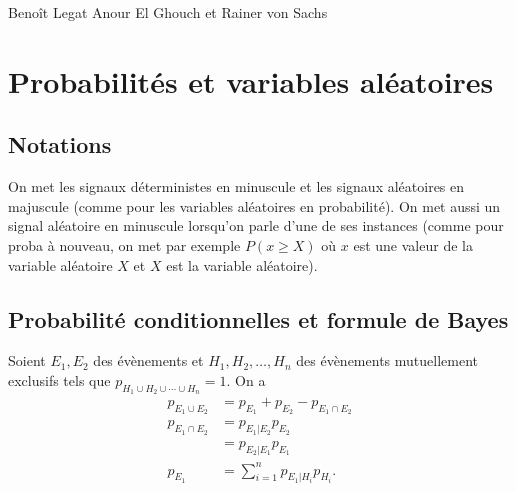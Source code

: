 

\usepackage{qtree}

\def\Perp{\perp\!\!\!\perp}

\renewcommand{\E}{\mathbb{E}}
\newcommand{\N}{\mathcal{N}}
\DeclareMathOperator{\var}{\mathbb{V}ar}
\DeclareMathOperator{\cov}{Cov}
\DeclareMathOperator{\bias}{Bias}

\DeclareMathOperator{\bin}{Bin}
\DeclareMathOperator{\expo}{Expo}
\DeclareMathOperator{\gammad}{Gamma}
\DeclareMathOperator{\po}{Po}

\newcommand{\fourier}{\mathcal{F}}
\newcommand{\esth}{\hat{\theta}}
\newcommand{\esthls}{\esth^{LS}}
\newcommand{\esthcm}{\esth^{CM}}
\newcommand{\esthmap}{\esth^{MAP}}
\newcommand{\esthml}{\esth^{ML}}
\newcommand{\esthblue}{\esth^{BLUE}}
\newcommand{\esthlmmse}{\esth^{BLUE}}
\newcommand{\eqmth}{\mathrm{EQM}_{\esth}}

{Benoît Legat}
{Anour El Ghouch et Rainer von Sachs}

\newcommand{\Ex}[1]{\E\left\{#1\right\}}


\section{Probabilités et variables aléatoires}
\subsection{Notations}
On met les signaux déterministes en minuscule et les signaux aléatoires en majuscule (comme pour les variables aléatoires en probabilité).
On met aussi un signal aléatoire en minuscule lorsqu'on parle d'une de ses instances (comme pour proba à nouveau, on met par exemple $P(x \geq X)$ où $x$ est une valeur de la variable aléatoire $X$ et $X$ est la variable aléatoire).

\subsection{Probabilité conditionnelles et formule de Bayes}
Soient $E_1, E_2$ des évènements et $H_1, H_2, \ldots, H_n$ des évènements mutuellement exclusifs tels que $p_{H_1 \cup H_2 \cup \cdots \cup H_n} = 1$.
On a
\begin{align*}
  p_{E_1 \cup E_2} & = p_{E_1} + p_{E_2} - p_{E_1 \cap E_2}\\
  p_{E_1 \cap E_2} & = p_{E_1|E_2} p_{E_2}\\
                   & = p_{E_2|E_1} p_{E_1}\\
  p_{E_1}          & = \sum_{i=1}^n p_{E_1|H_i} p_{H_i}.
\end{align*}

